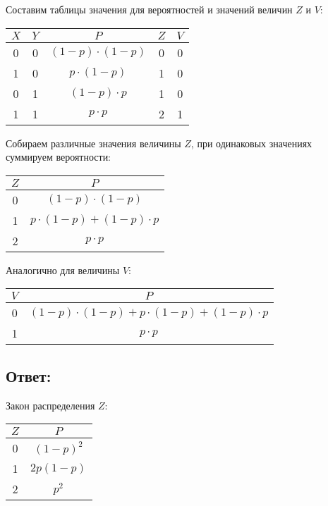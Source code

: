 Составим таблицы значения для вероятностей и значений величин $Z$ и $V$:

\begin{tabular}{|c|c|c|c|c|}
    \hline
    $X$ & $Y$ & $P$                 & $Z$ & $V$ \\
    \hline
    0   & 0   & $(1-p) \cdot (1-p)$ & 0   & 0   \\
    \hline
    1   & 0   & $p \cdot (1-p)$     & 1   & 0   \\
    \hline
    0   & 1   & $(1-p) \cdot p$     & 1   & 0   \\
    \hline
    1   & 1   & $p \cdot p$         & 2   & 1   \\
    \hline
\end{tabular}

Собираем различные значения величины $Z$, при одинаковых значениях суммируем вероятности:

\begin{tabular}{|c|c|}
    \hline
    $Z$ & $P$                             \\
    \hline
    0   & $(1-p) \cdot (1-p)$             \\
    \hline
    1   & $p \cdot (1-p) + (1-p) \cdot p$ \\
    \hline
    2   & $p \cdot p$                     \\
    \hline
\end{tabular}

Аналогично для величины $V$:

\begin{tabular}{|c|c|}
    \hline
    $V$ & $P$                                                 \\
    \hline
    0   & $(1-p) \cdot (1-p) + p \cdot (1-p) + (1-p) \cdot p$ \\
    \hline
    1   & $p \cdot p$                                         \\
    \hline
\end{tabular}

\subsection*{Ответ:}
Закон распределения $Z$:

\begin{tabular}{|c|c|}
    \hline
    $Z$ & $P$         \\
    \hline
    0   & $(1-p)^2$   \\
    \hline
    1   & $2 p (1-p)$ \\
    \hline
    2   & $p^2$       \\
    \hline
\end{tabular}

